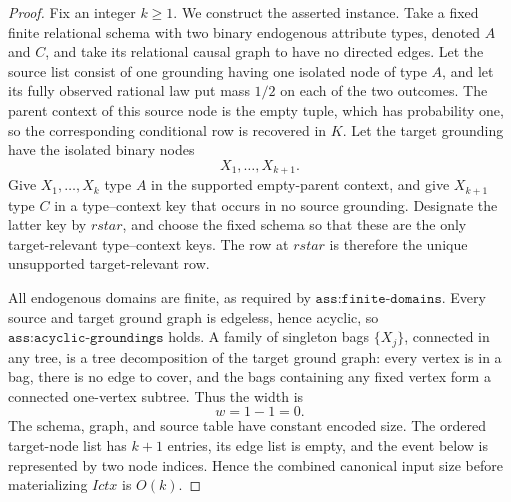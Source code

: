 \documentclass{article}
\begin{document}
\begin{proof}
Fix an integer \(k\geq 1\).  We construct the asserted instance.  Take a fixed finite relational schema with two binary endogenous attribute types, denoted \(A\) and \(C\), and take its relational causal graph to have no directed edges.  Let the source list consist of one grounding having one isolated node of type \(A\), and let its fully observed rational law put mass \(1/2\) on each of the two outcomes.  The parent context of this source node is the empty tuple, which has probability one, so the corresponding conditional row is recovered in \(K\).  Let the target grounding have the isolated binary nodes
\[
X_1,\ldots,X_{k+1}.
\]
Give \(X_1,\ldots,X_k\) type \(A\) in the supported empty-parent context, and give \(X_{k+1}\) type \(C\) in a type--context key that occurs in no source grounding.  Designate the latter key by \(rstar\), and choose the fixed schema so that these are the only target-relevant type--context keys.  The row at \(rstar\) is therefore the unique unsupported target-relevant row.

All endogenous domains are finite, as required by \(\texttt{ass:finite-domains}\).  Every source and target ground graph is edgeless, hence acyclic, so \(\texttt{ass:acyclic-groundings}\) holds.  A family of singleton bags \(\{X_j\}\), connected in any tree, is a tree decomposition of the target ground graph: every vertex is in a bag, there is no edge to cover, and the bags containing any fixed vertex form a connected one-vertex subtree.  Thus the width is
\[
w=1-1=0.
\]
The schema, graph, and source table have constant encoded size.  The ordered target-node list has \(k+1\) entries, its edge list is empty, and the event below is represented by two node indices.  Hence the combined canonical input size before materializing \(Ictx\) is \(O(k)\).


\end{proof}
\end{document}
